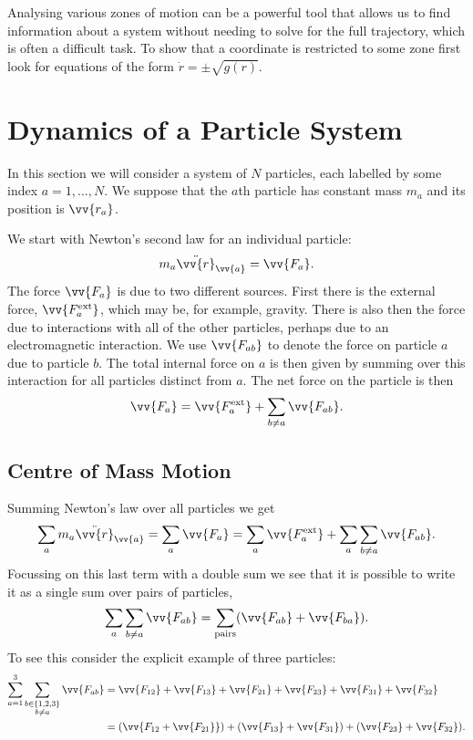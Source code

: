 \documentclass[fleqn]{NotesClass}
\newcommand*{\ext}{\mathrm{ext}}
\begin{document}
    Analysing various zones of motion can be a powerful tool that allows us to find information about a system without needing to solve for the full trajectory, which is often a difficult task.
    To show that a coordinate is restricted to some zone first look for equations of the form \(\dot{r} = \pm\sqrt{g(r)}\).
   
    \chapter{Dynamics of a Particle System}
    In this section we will consider a system of \(N\) particles, each labelled by some index \(a = 1, \dotsc, N\).
    We suppose that the \(a\)th particle has constant mass \(m_a\) and its position is \(\vv{r_a}\).
    
    We start with Newton's second law for an individual particle:
    \begin{equation}
        m_a\ddot{\vv{r}}_{\vv{a}} = \vv{F_a}.
    \end{equation}
    The force \(\vv{F_a}\) is due to two different sources.
    First there is the external force, \(\vv{F_a^{\ext}}\), which may be, for example, gravity.
    There is also then the force due to interactions with all of the other particles, perhaps due to an electromagnetic interaction.
    We use \(\vv{F_{ab}}\) to denote the force on particle \(a\) due to particle \(b\).
    The total internal force on \(a\) is then given by summing over this interaction for all particles distinct from \(a\).
    The net force on the particle is then
    \begin{equation}
        \vv{F_a} = \vv{F_a^{\ext}} + \sum_{b \ne a} \vv{F_{ab}}.
    \end{equation}
    
    \section{Centre of Mass Motion}
    Summing Newton's law over all particles we get
    \begin{equation}
        \sum_{a} m_a\ddot{\vv{r}}_{\vv{a}} = \sum_a\vv{F_a} = \sum_a \vv{F_a^{\ext}} + \sum_a \sum_{b\ne a} \vv{F_{ab}}.
    \end{equation}
    Focussing on this last term with a double sum we see that it is possible to write it as a single sum over pairs of particles,
    \begin{equation}
        \sum_{a}\sum_{b\ne a} \vv{F_{ab}} = \sum_{\text{pairs}} (\vv{F_{ab}} + \vv{F_{ba}}).
    \end{equation}
    To see this consider the explicit example of three particles:
    \begin{align}
        \sum_{a=1}^{3}\sum_{\substack{b\in\{1, 2, 3\}\\b\ne a}} \vv{F_{ab}} &= \vv{F_{12}} + \vv{F_{13}} + \vv{F_{21}} + \vv{F_{23}} + \vv{F_{31}} + \vv{F_{32}}\\
        &= (\vv{F_{12} + \vv{F_{21}}}) + (\vv{F_{13}} + \vv{F_{31}}) + (\vv{F_{23}} + \vv{F_{32}}).
    \end{align}
    
\end{document}
